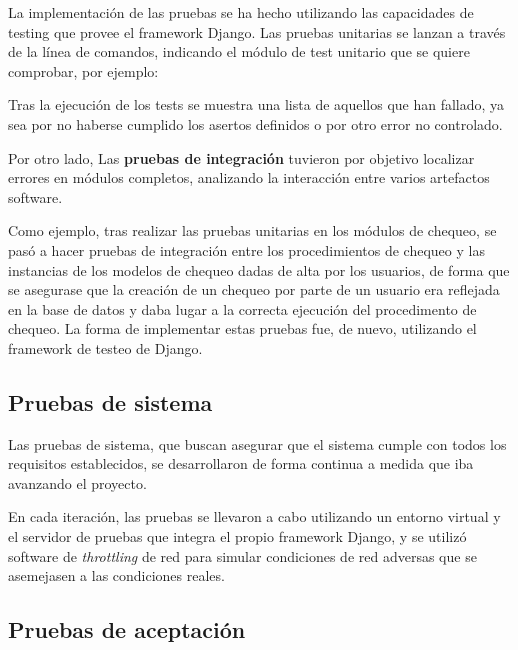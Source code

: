 La implementación de las pruebas se ha hecho utilizando las capacidades de
testing que provee el framework Django. Las pruebas unitarias se lanzan a través
de la línea de comandos, indicando el módulo de test unitario que se quiere
comprobar, por ejemplo:


Tras la ejecución de los tests se muestra una lista de aquellos que han fallado,
ya sea por no haberse cumplido los asertos definidos o por otro error no
controlado. 

Por otro lado, Las \textbf{pruebas de integración} tuvieron por objetivo
localizar errores en módulos completos, analizando la interacción entre varios
artefactos software.

Como ejemplo, tras realizar las pruebas unitarias en los módulos de chequeo, se
pasó a hacer pruebas de integración entre los procedimientos de chequeo y las
instancias de los modelos de chequeo dadas de alta por los usuarios, de forma
que se asegurase que la creación de un chequeo por parte de un usuario era
reflejada en la base de datos y daba lugar a la correcta ejecución del
procedimento de chequeo. La forma de implementar estas pruebas fue, de nuevo,
utilizando el framework de testeo de Django.

\subsection{Pruebas de sistema}

Las pruebas de sistema, que buscan asegurar que el sistema cumple con todos los
requisitos establecidos, se desarrollaron de forma continua a medida que iba
avanzando el proyecto. 

En cada iteración, las pruebas se llevaron a cabo utilizando un entorno virtual
y el servidor de pruebas que integra el propio framework Django, y se utilizó
software de \textit{throttling} de red para simular condiciones de red adversas
que se asemejasen a las condiciones reales.

\subsection{Pruebas de aceptación}

